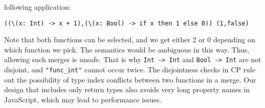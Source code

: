 following application:
\begin{lstlisting}
((\(x: Int) -> x + 1),(\(x: Bool) -> if x then 1 else 0)) (1,false)
\end{lstlisting}
Note that both functions can be selected, and we get either 2 or 0 depending on
which function we pick. The semantics would be ambiguous in this way. Thus,
allowing such merges is unsafe. That is why \lstinline{Int -> Int} and
\lstinline{Bool -> Int} are not disjoint, and \lstinline{"func_int"} cannot
occur twice. The disjointness checks in CP rule out the possibility of type
index conflicts between two functions in a merge. Our design that includes only
return types also avoids very long property names in JavaScript, which may lead
to performance issues.

\begin{comment}
However, there are some rare corner cases where this design causes trouble. Here
is an example:
\begin{lstlisting}
type A = (Int -> Int&Bool) -> Int;
type B = (Int -> Int&String) -> Int;
f (g: Int -> Int) = g 0;
f' = f : A&B;
f'' = f' : A;
f'' (\(x:Int) -> x,true)
\end{lstlisting}
Although the types of components of a merge are guaranteed to be disjoint, there
is no rule guaranteeing components of an intersection type to be disjoint.
Therefore, we can duplicate the function by casting \lstinline{f} to type
\lstinline{A&B}. Since \lstinline{A} and \lstinline{B} are not disjoint and have
the same return type, they would share the same type index
\lstinline{"func_int"}. We could not distinguish them by type indices, and the
field for \lstinline{f:B} would override that for \lstinline{f:A} in our
implementation. At first sight, it somehow makes sense because they are
essentially the same function so we do not need to keep two copies. However, the
trouble here is that their parameters have different type indices:
\lstinline{"func_(bool&int)"} for \lstinline{A}'s parameter and
\lstinline{"func_(int&string)"} for \lstinline{B}'s. This subtle difference
leads to slightly different compilation results for \lstinline{f:A} and
\lstinline{f:B}. The code above would go wrong as we do not distinguish them and
misuse \lstinline{f:B} as \lstinline{f:A}.

The fix is easy. Our formalization in \autoref{ch:calculi} uses a more precise
representation for function types: both the parameter and return types are
included in the type indices. Nevertheless, the issue is really rare, and we
have never encountered such a case in benchmarks. For performance reasons, we
still use the shorter type indices that only include return types in our
implementation. To make the compiled code more concise, we also use this
representation in \autoref{ch:compilation}.
\end{comment}

